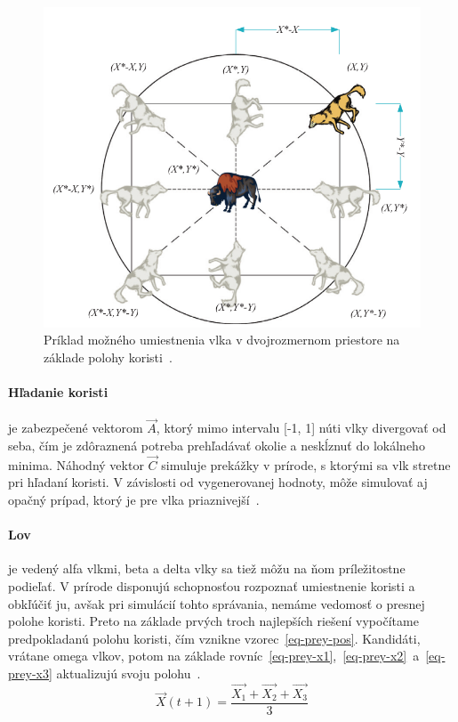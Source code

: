 \documentclass[a4paper,slovak,12pt,appendix]{article}
\begin{document}
\begin{figure}[ht]
  \centering
	\captionsetup{justification=centering}
  \includegraphics[width=\textwidth]{wolf_vector_positions.png}
  \caption[Príklad možného umiestnenia vlka na základe polohy koristi.]{Príklad možného umiestnenia vlka v dvojrozmernom priestore na základe polohy koristi~\cite{Seeley1991}.}
  \label{fig-wolf-pos}
\end{figure}

\paragraph{Hľadanie koristi} je zabezpečené vektorom $\vec{A}$, ktorý mimo
intervalu [-1, 1] núti vlky divergovať od seba, čím je zdôraznená potreba
prehľadávať okolie a neskĺznuť do lokálneho minima. Náhodný vektor $\vec{C}$
simuluje prekážky v prírode, s ktorými sa vlk stretne pri hľadaní koristi.
V závislosti od vygenerovanej hodnoty, môže simulovať aj opačný prípad, ktorý
je pre vlka priaznivejší~\cite{Seeley1991}.

\paragraph{Lov} je vedený alfa vlkmi, beta a delta vlky sa tiež môžu na ňom
príležitostne podieľať. V prírode disponujú schopnosťou rozpoznať
umiestnenie koristi a obkľúčiť ju, avšak pri simulácií tohto správania, nemáme
vedomosť o presnej polohe koristi. Preto na základe prvých troch najlepších
riešení vypočítame predpokladanú polohu koristi, čím vznikne
vzorec~\ref{eq-prey-pos}. Kandidáti, vrátane omega vlkov, potom na základe
rovníc~\ref{eq-prey-x1},~\ref{eq-prey-x2}~a~\ref{eq-prey-x3} aktualizujú svoju
polohu~\cite{Seeley1991}.
\begin{equation}
  \vec{X}(t+1) = \frac{\vec{X_1} + \vec{X_2} + \vec{X_3}}{3}
  \label{eq-prey-pos}
\end{equation}
\end{document}
